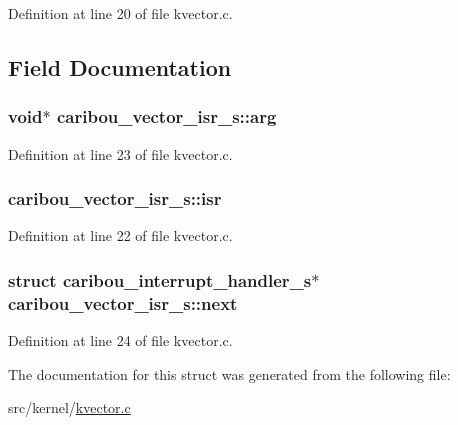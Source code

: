 Definition at line 20 of file kvector.\-c.



\subsection{Field Documentation}
\hypertarget{structcaribou__vector__isr__s_a69c6e5eb71a00da6d588fe67ca848cf0}{
\subsubsection[{arg}]{\setlength{\rightskip}{0pt plus 5cm}void$\ast$ caribou\-\_\-vector\-\_\-isr\-\_\-s\-::arg}}\label{structcaribou__vector__isr__s_a69c6e5eb71a00da6d588fe67ca848cf0}


Definition at line 23 of file kvector.\-c.

\hypertarget{structcaribou__vector__isr__s_a31515e3e911a86a7a7a9813741963476}{
\subsubsection[{isr}]{ caribou\-\_\-vector\-\_\-isr\-\_\-s\-::isr}}\label{structcaribou__vector__isr__s_a31515e3e911a86a7a7a9813741963476}


Definition at line 22 of file kvector.\-c.

\hypertarget{structcaribou__vector__isr__s_a801c57c3cd570449fb04863be1129854}{
\subsubsection[{next}]{\setlength{\rightskip}{0pt plus 5cm}struct {\bf caribou\-\_\-interrupt\-\_\-handler\-\_\-s}$\ast$ caribou\-\_\-vector\-\_\-isr\-\_\-s\-::next}}\label{structcaribou__vector__isr__s_a801c57c3cd570449fb04863be1129854}


Definition at line 24 of file kvector.\-c.



The documentation for this struct was generated from the following file\-:\begin{DoxyCompactItemize}
\item 
src/kernel/\hyperlink{kvector_8c}{kvector.\-c}\end{DoxyCompactItemize}
